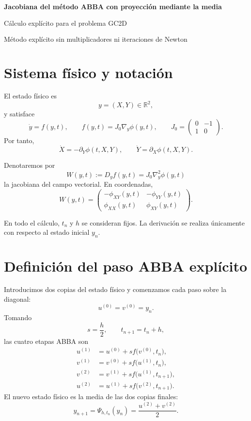 \documentclass[11pt,a4paper]{article}
\newcommand{\R}{\mathbb{R}}
\begin{document}
\begin{center}
  {\LARGE\bfseries\color{azul}Jacobiana del método ABBA con proyección mediante la media}\par
  \vspace{0.35em}
  {\large Cálculo explícito para el problema GC2D}\par
  \vspace{0.4em}
  {\small Método explícito sin multiplicadores ni iteraciones de Newton}
\end{center}

\vspace{0.45em}

\section{Sistema físico y notación}

El estado físico es
\[
 y=(X,Y)\in\R^2,
\]
y satisface
\[
 \dot y=f(y,t),
 \qquad
 f(y,t)=J_0\nabla_y\phi(y,t),
 \qquad
 J_0=
 \begin{pmatrix}
  0&-1\\
  1&0
 \end{pmatrix}.
\]
Por tanto,
\[
 \dot X=-\partial_Y\phi(t,X,Y),
 \qquad
 \dot Y=\partial_X\phi(t,X,Y).
\]

Denotaremos por
\[
 W(y,t):=D_yf(y,t)=J_0\nabla_y^2\phi(y,t)
\]
la jacobiana del campo vectorial. En coordenadas,
\[
 \boxed{
 W(y,t)=
 \begin{pmatrix}
  -\phi_{XY}(y,t)&-\phi_{YY}(y,t)\\
  \phi_{XX}(y,t)&\phi_{XY}(y,t)
 \end{pmatrix}.}
 \tag{1}
\]

En todo el cálculo, \(t_n\) y \(h\) se consideran fijos. La derivación se realiza
únicamente con respecto al estado inicial \(y_n\).

\section{Definición del paso ABBA explícito}

Introducimos dos copias del estado físico y comenzamos cada paso sobre la diagonal:
\[
 u^{(0)}=v^{(0)}=y_n.
 \tag{2}
\]
Tomando
\[
 s=\frac h2,
 \qquad
 t_{n+1}=t_n+h,
\]
las cuatro etapas ABBA son
\begin{align}
 u^{(1)}
 &=u^{(0)}+s f\bigl(v^{(0)},t_n\bigr),
 \tag{3a}\\
 v^{(1)}
 &=v^{(0)}+s f\bigl(u^{(1)},t_n\bigr),
 \tag{3b}\\
 v^{(2)}
 &=v^{(1)}+s f\bigl(u^{(1)},t_{n+1}\bigr),
 \tag{3c}\\
 u^{(2)}
 &=u^{(1)}+s f\bigl(v^{(2)},t_{n+1}\bigr).
 \tag{3d}
\end{align}
El nuevo estado físico es la media de las dos copias finales:
\[
 \boxed{
 y_{n+1}=\Psi_{h,t_n}(y_n)
 =\frac{u^{(2)}+v^{(2)}}2.}
 \tag{4}
\]
\end{document}
